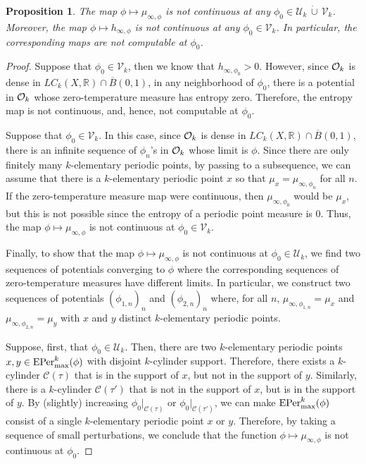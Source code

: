 \documentclass[11pt, reqno]{amsart}
\newtheorem{proposition}[theorem]{Proposition}
\newcommand{\EPer}{{\rm EPer}}
\newcommand{\bR}{{\mathbb R}}
\newcommand{\cC}{{\mathcal C}}
\newcommand{\cU}{{\mathcal U}}
\newcommand{\cV}{{\mathcal V}}
\def\EPer{{\rm EPer}}
\begin{document}
\begin{proposition}
The map $\phi\mapsto \mu_{\infty,\phi}$ is not continuous at any $\phi_0\in\cU_k\,\dot\cup\,\cV_k$.  Moreover, the map $\phi\mapsto h_{\infty,\phi}$ is not continuous at any $\phi_0\in\cV_k$.  In particular, the corresponding maps are not computable at $\phi_0$.
\end{proposition}
\begin{proof}
Suppose that $\phi_0\in\cV_k$, then we know that $h_{\infty,\phi_0}>0$.  However, since $\mathcal O_k$ is dense in $LC_k(X,\bR)\cap\overline{B}(0,1)$, in any neighborhood of $\phi_0$, there is a potential in $\mathcal O_k$ whose zero-temperature measure has entropy zero.  Therefore, the entropy map is not continuous, and, hence, not computable at $\phi_0$.

Suppose that $\phi_0\in\cV_k$.  In this case, since $\mathcal O_k$ is dense in $LC_k(X,\bR)\cap\overline{B}(0,1)$, there is an infinite sequence of $\phi_n$'s in $\mathcal O_k$ whose limit is $\phi$.  Since there are only finitely many $k$-elementary periodic points, by passing to a subsequence, we can assume that there is a $k$-elementary periodic point $x$ so that $\mu_x=\mu_{\infty,\phi_n}$ for all $n$.  If the zero-temperature measure map were continuous, then $\mu_{\infty,\phi_0}$ would be $\mu_x$, but this is not possible since the entropy of a periodic point measure is $0$.  Thus, the map $\phi\mapsto \mu_{\infty,\phi}$ is not continuous at $\phi_0\in\cV_k$.

Finally, to show that the map $\phi\mapsto \mu_{\infty,\phi}$ is not continuous at $\phi_0\in\cU_k$, we find two sequences of potentials converging to $\phi$ where the corresponding sequences of zero-temperature measures have different limits.  In particular, we construct two sequences of potentials $(\phi_{1,n})_n$ and $(\phi_{2,n})_n$ where, for all $n$, $\mu_{\infty,\phi_{1,n}}=\mu_x$ and $\mu_{\infty,\phi_{2,n}}=\mu_y$ with $x$ and $y$ distinct $k$-elementary periodic points.

Suppose, first, that $\phi_0\in\cU_k$.  Then, there are two $k$-elementary periodic points $x,y\in\EPer_{\max}^k(\phi)$ with disjoint $k$-cylinder support.  Therefore, there exists a $k$-cylinder $\cC(\tau)$ that is in the support of $x$, but not in the support of $y$.  Similarly, there is a $k$-cylinder $\cC(\tau')$ that is not in the support of $x$, but is in the support of $y$.  By (slightly) increasing $\phi_0|_{\cC(\tau)}$ or $\phi_0|_{\cC(\tau')}$, we can make $\EPer_{\max}^k(\phi)$ consist of a single $k$-elementary periodic point $x$ or $y$.  Therefore, by taking a sequence of small perturbations, we conclude that the function $\phi\mapsto \mu_{\infty,\phi}$ is not continuous at $\phi_0$.
\end{proof}
\end{document}
